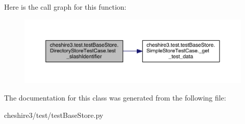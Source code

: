 Here is the call graph for this function\-:
\nopagebreak
\begin{figure}[H]
\begin{center}
\leavevmode
\includegraphics[width=350pt]{classcheshire3_1_1test_1_1test_base_store_1_1_directory_store_test_case_ac92ffaf9a1e363abf334da1bee8bbd0c_cgraph}
\end{center}
\end{figure}




The documentation for this class was generated from the following file\-:\begin{DoxyCompactItemize}
\item 
cheshire3/test/test\-Base\-Store.\-py\end{DoxyCompactItemize}
